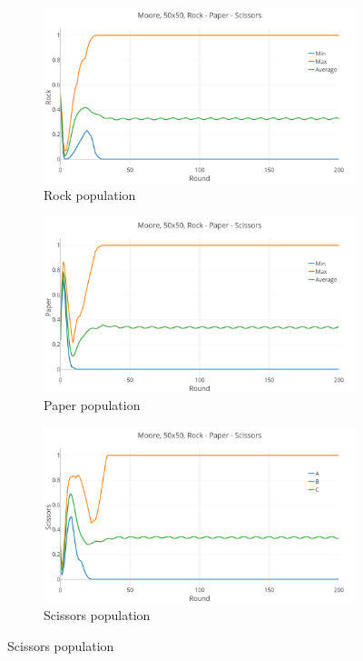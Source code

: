 \documentclass[a4paper, 11pt]{article}
\begin{document}
\begin{landscape}
\begin{figure}[H]
	\begin{subfigure}{0.53\textwidth}
		\includegraphics[width=1\linewidth]{50x50_50RockDist_Rock}
		\caption{Rock population}
	\end{subfigure}%
	\begin{subfigure}{0.53\textwidth}
		\includegraphics[width=1\linewidth]{50x50_50RockDist_Paper}
		\caption{Paper population}
	\end{subfigure}%
	\begin{subfigure}{0.53\textwidth}
		\includegraphics[width=1\linewidth]{50x50_50RockDist_Scissors}
		\caption{Scissors population}
	\end{subfigure}
\end{figure}


\end{landscape}
\end{document}
